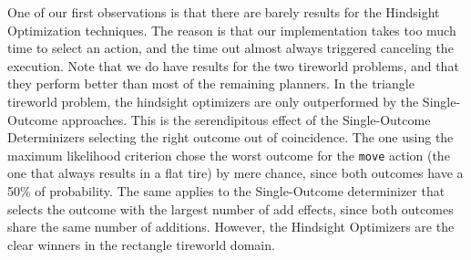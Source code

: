 \documentclass[../root.tex]{subfiles}
\begin{document}
\begin{table}
\centering
\caption{Results of the experiments with the ''terrain`` and the recycling domain (``imagine'')}
\label{tab:results-determinization-ours}
\end{table}

One of our first observations is that there are barely results for the Hindsight Optimization
techniques. The reason is that our implementation takes too much time to select an action, and
the time out almost always triggered canceling the execution. Note that we do have results
for the two tireworld problems, and that they perform better than most of the remaining
planners. In the triangle tireworld problem, the hindsight optimizers are only outperformed
by the Single-Outcome approaches. This is the serendipitous effect of the Single-Outcome
Determinizers selecting the right outcome out of coincidence. The one using the maximum likelihood
criterion chose the worst outcome for the \texttt{move} action (the one that always
results in a flat tire) by mere chance, since both outcomes have a 50\% of probability. The same
applies to the Single-Outcome determinizer that selects the outcome with the largest number
of add effects, since both outcomes share the same number of additions. However, the Hindsight
Optimizers are the clear winners in the rectangle tireworld domain.
\end{document}
